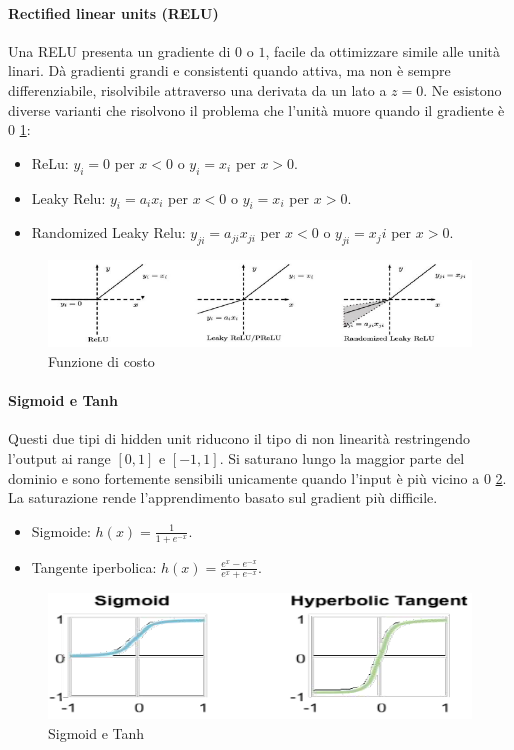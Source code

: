 		\paragraph{Rectified linear units (RELU)}
		Una RELU presenta un gradiente di $0$ o $1$, facile da ottimizzare simile alle unit\`a linari.
		D\`a gradienti grandi e consistenti quando attiva, ma non \`e sempre differenziabile, risolvibile attraverso una derivata da un lato a $z=0$.
		Ne esistono diverse varianti che risolvono il problema che l'unit\`a muore quando il gradiente \`e $0$ \ref{fig:chapter11-07}:
		\begin{multicols}{2}
			\begin{itemize}
				\item ReLu: $y_i = 0$ per $x < 0$ o $y_i = x_i$ per $x >0$.
				\item Leaky Relu: $y_i = a_ix_i$ per $x < 0$ o $y_i = x_i$ per $x >0$.
				\item Randomized Leaky Relu: $y_{ji} = a_{ji}x_{ji}$ per $x < 0$ o $y_{ji} = x_{j}i$ per $x >0$.
			\end{itemize}
		\end{multicols}
		\begin{figure}
			\centering
			\includegraphics[width=0.8\linewidth]{imgs/chapter11/img7}
			\caption{Funzione di costo}
			\label{fig:chapter11-07}
		\end{figure}
		
		\paragraph{Sigmoid e Tanh}
		Questi due tipi di hidden unit riducono il tipo di non linearit\`a restringendo l'output ai range $[0,1]$ e $[-1,1]$.
		Si saturano lungo la maggior parte del dominio e sono fortemente sensibili unicamente quando l'input \`e pi\`u vicino a $0$ \ref{fig:chapter11-08}.
		La saturazione rende l'apprendimento basato sul gradient pi\`u difficile.
		\begin{multicols}{2}
			\begin{itemize}
				\item Sigmoide: $h(x) = \frac{1}{1+e^{-x}}$.
				\item Tangente iperbolica: $h(x) = \frac{e^x-e^{-x}}{e^x+e^{-x}}$.
			\end{itemize}
		\end{multicols}
		\begin{figure}
			\centering
			\includegraphics[width=0.6\linewidth]{imgs/chapter11/img8}
			\caption{Sigmoid e Tanh}
			\label{fig:chapter11-08}
		\end{figure}

